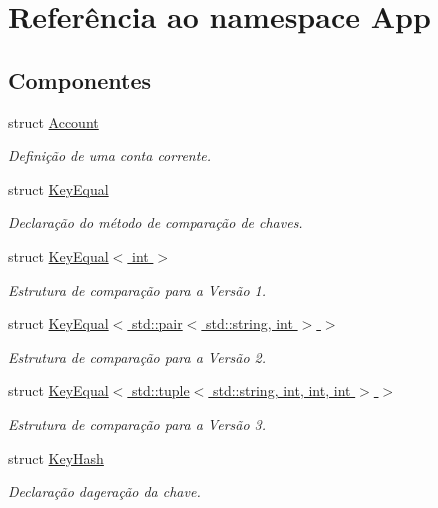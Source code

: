 \hypertarget{namespaceApp}{}\section{Referência ao namespace App}
\label{namespaceApp}
\subsection*{Componentes}
\begin{DoxyCompactItemize}
\item 
struct \hyperlink{structApp_1_1Account}{Account}
\begin{DoxyCompactList}\small\item\em Definição de uma conta corrente. \end{DoxyCompactList}\item 
struct \hyperlink{structApp_1_1KeyEqual}{Key\+Equal}
\begin{DoxyCompactList}\small\item\em Declaração do método de comparação de chaves. \end{DoxyCompactList}\item 
struct \hyperlink{structApp_1_1KeyEqual_3_01int_01_4}{Key\+Equal$<$ int $>$}
\begin{DoxyCompactList}\small\item\em Estrutura de comparação para a Versão 1. \end{DoxyCompactList}\item 
struct \hyperlink{structApp_1_1KeyEqual_3_01std_1_1pair_3_01std_1_1string_00_01int_01_4_01_4}{Key\+Equal$<$ std\+::pair$<$ std\+::string, int $>$ $>$}
\begin{DoxyCompactList}\small\item\em Estrutura de comparação para a Versão 2. \end{DoxyCompactList}\item 
struct \hyperlink{structApp_1_1KeyEqual_3_01std_1_1tuple_3_01std_1_1string_00_01int_00_01int_00_01int_01_4_01_4}{Key\+Equal$<$ std\+::tuple$<$ std\+::string, int, int, int $>$ $>$}
\begin{DoxyCompactList}\small\item\em Estrutura de comparação para a Versão 3. \end{DoxyCompactList}\item 
struct \hyperlink{structApp_1_1KeyHash}{Key\+Hash}
\begin{DoxyCompactList}\small\item\em Declaração da\textquotesingle{}geração da chave. \end{DoxyCompactList}\item 

\end{DoxyCompactItemize}
